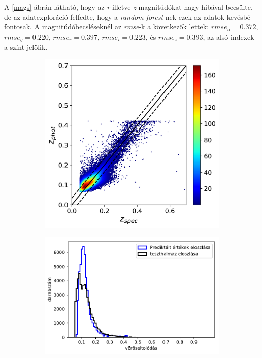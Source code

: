 \documentclass[12pt,letterpaper,oneside,openright]{book}
\begin{document}
 A \ref{mags} ábrán látható, hogy az \textit{r} illetve \textit{z} magnitúdókat nagy hibával becsülte, de az adatexploráció felfedte, hogy a \textit{random forest}-nek ezek az adatok kevésbé fontosak. A magnitúdóbecsléseknél az \textit{rmse}-k a következők lettek: $rmse_u = 0.372$, $rmse_g = 0.220$, $rmse_r = 0.397$, $rmse_i = 0.223$, és $rmse_z = 0.393$, az alsó indexek a színt jelölik. 
 \begin{figure}[h!]
 \centering
  \begin{subfigure}[b]{0.3\textwidth}
    \includegraphics[width=\textwidth, height = \textwidth]{Figures/pRF.png}
    \label{fig:1}
  \end{subfigure}
  \hspace{1.7cm}
  \begin{subfigure}[b]{0.3\textwidth}
    \includegraphics[width=\textwidth, height = \textwidth]{Figures/histrf.pdf}

\end{subfigure}
\end{figure}
\end{document}
